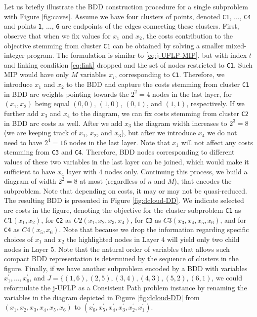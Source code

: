 \documentclass[11pt]{article}
\begin{document}
Let us briefly illustrate the BDD construction procedure for a single subproblem
with Figure \ref{fig:caves}. Assume we have four clusters of points, denoted \texttt{C1},
\(\ldots\), \texttt{C4} and points \texttt{1}, \(\ldots\), \texttt{6} are endpoints of the edges
connecting these clusters. First, observe that when we fix values for \(x_1\) and
\(x_2\), the costs contribution to the objective stemming from cluster \texttt{C1} can be
obtained by solving a smaller mixed-integer program. The formulation is similar
to \eqref{eq:j-UFLP-MIP}, but with index \(t\) and linking condition \eqref{eq:link}
dropped and the set of nodes restricted to \texttt{C1}. Such MIP would have only \(M\)
variables \(x_i\), corresponding to \texttt{C1}. Therefore, we introduce \(x_1\) and \(x_2\)
to the BDD and capture the costs stemming from cluster \texttt{C1} in BDD arc weights
pointing towards the \(2^2=4\) nodes in the last layer, for \((x_1,x_2)\) being
equal \((0,0)\), \((1,0)\), \((0,1)\), and \((1,1)\), respectively. If we further add
\(x_3\) and \(x_4\) to the diagram, we can fix costs stemming from cluster \texttt{C2} in
BDD arc costs as well. After we add \(x_3\) the diagram width increases to \(2^3=8\)
(we are keeping track of \(x_1\), \(x_2\), and \(x_3\)), but after we introduce \(x_4\)
we do not need to have \(2^4=16\) nodes in the last layer. Note that \(x_1\) will
not affect any costs stemming from \texttt{C3} and \texttt{C4}. Therefore, BDD nodes
corresponding to different values of these two variables in the last layer can
be joined, which would make it sufficient to have \(x_4\) layer with \(4\) nodes
only. Continuing this process, we build a diagram of width \(2^2=8\) at most
(regardless of \(n\) and \(M\)), that encodes the subproblem. Note that depending on
costs, it may or may not be quasi-reduced. The resulting BDD is presented in
Figure \ref{fig:dcloud-DD}. We indicate selected arc costs in the figure, denoting
the objective for the cluster subproblem \texttt{C1} as \(C1(x_1, x_2)\), for \texttt{C2} as
\(C2(x_1, x_2, x_3, x_4)\), for \texttt{C3} as \(C3(x_3, x_4, x_5, x_6)\), and for \texttt{C4} as
\(C4(x_5, x_6)\). Note that because we drop the information regarding specific
choices of \(x_1\) and \(x_2\) the highlighted nodes in Layer 4 will yield only two
child nodes in Layer 5. Note that the natural order of variables that allows
such compact BDD representation is determined by the sequence of clusters in the
figure. Finally, if we have another subproblem encoded by a BDD with variables
\(x_1^\prime, \ldots, x_6^\prime\), and \(J=\{(1,6), (2,5), (3,4), (4,3), (5,2), (6,1)\), we could
reformulate the j-UFLP as a Consistent Path problem instance by renaming the
variables in the diagram depicted in Figure \ref{fig:dcloud-DD} from \((x_1, x_2,
x_3, x_4, x_5, x_6)\) to \((x^\prime_6, x^\prime_5, x^\prime_4, x^\prime_3,
x^\prime_2, x^\prime_1)\).
\end{document}
